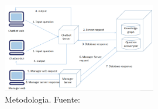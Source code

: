 \begin{figure}[H]
	\begin{center}
		\includegraphics[width=0.6\textwidth]{2/1_antecedentes/Metodologia-5.png}
		\caption{Metodologia. Fuente: \cite{HHHAnOnlineMedical} }
	\end{center}
\end{figure}
\vspace{-10mm}
